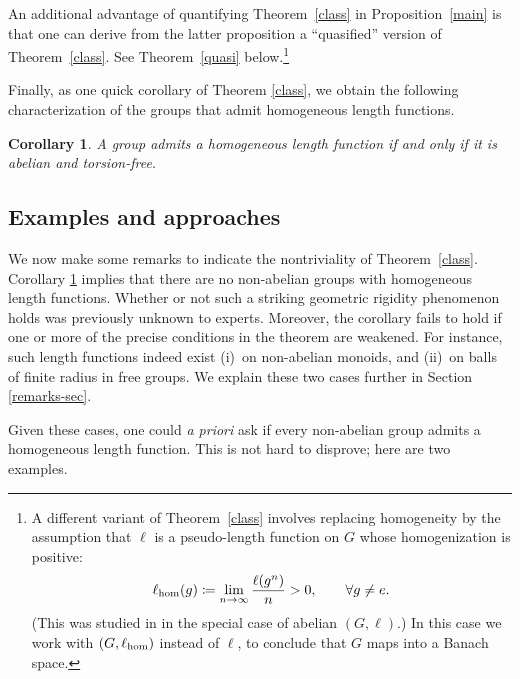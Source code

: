 \documentclass[11pt,a4paper,reqno]{amsart}
\numberwithin{equation}{section}
\theoremstyle{plain}
\newtheorem{corollary}[equation]{Corollary}
\theoremstyle{definition}
\newcommand\normsymb{\ell}  %
\newcommand\norm[1]{\ell({#1})}   %
\begin{document}
An additional advantage of quantifying Theorem~\ref{class}
in Proposition~\ref{main} is that one can derive from the latter
proposition a ``quasified'' version of Theorem~\ref{class}. See
Theorem~\ref{quasi} below.\footnote{A different variant of
Theorem~\ref{class} involves replacing homogeneity by the assumption that
$\normsymb$ is a pseudo-length function on $G$ whose homogenization is
positive:
\[
\normsymb_{\rm hom}(g) \coloneqq \lim_{n \to \infty} \frac{\norm{g^n}}{n}
> 0, \qquad \forall g \neq e.
\]
(This was studied in \cite[Theorem 2.10(III)]{Niem} in the special case
of abelian $(G,\normsymb)$.) In this case we work with $(G,
\normsymb_{\rm hom})$ instead of $\normsymb$, to conclude that $G$ maps
into a Banach space.}


Finally, as one quick corollary of Theorem \ref{class}, we obtain the
following characterization of the groups that admit homogeneous length
functions.

\begin{corollary}\label{abel}
A group admits a homogeneous length function if and only if it is
abelian and torsion-free.
\end{corollary}


\subsection{Examples and approaches}

We now make some remarks to indicate the nontriviality of
Theorem~\ref{class}. Corollary \ref{abel} implies that there are no
non-abelian groups with homogeneous length functions.
Whether or not such a striking geometric rigidity phenomenon holds was
previously unknown to experts. Moreover, the corollary fails
to hold if one or more of the precise conditions in the theorem are
weakened. For instance, such length functions indeed exist (i)~on
non-abelian monoids, and (ii)~on balls of finite radius in free groups.
We explain these two cases further in Section \ref{remarks-sec}.

Given these cases, one could \textit{a priori} ask if every non-abelian
group admits a homogeneous length function. This is not hard to disprove;
here are two examples.
\end{document}
